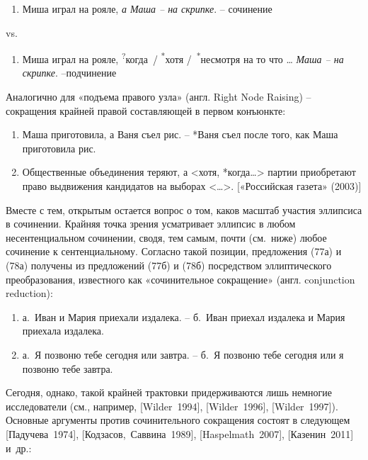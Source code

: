 \begin{enumerate}
\def\labelenumi{(\arabic{enumi})}
\setcounter{enumi}{72}
\item
  Миша играл на рояле, \emph{а Маша -- на скрипке}. -- сочинение
\end{enumerate}

vs.

\begin{enumerate}
\def\labelenumi{(\arabic{enumi})}
\setcounter{enumi}{73}
\item
  Миша играл на рояле, \textsuperscript{?}когда~/
  \textsuperscript{*}хотя /~\textsuperscript{*}несмотря на то что
  \ldots{} \emph{Маша -- на скрипке}. --подчинение
\end{enumerate}

Аналогично для «подъема правого узла» (англ. Right Node Raising) --
сокращения крайней правой составляющей в первом конъюнкте:

\begin{enumerate}
\def\labelenumi{(\arabic{enumi})}
\setcounter{enumi}{74}
\item
  Маша приготовила, а Ваня съел рис. -- *Ваня съел после того, как Маша
  приготовила рис.
\item
  Общественные объединения теряют, а \textless*хотя,
  *когда\ldots\textgreater{} партии приобретают право выдвижения
  кандидатов на выборах \textless\ldots\textgreater. {[}«Российская
  газета» (2003){]}
\end{enumerate}

Вместе с тем, открытым остается вопрос о том, каков масштаб участия
эллипсиса в сочинении. Крайняя точка зрения усматривает эллипсис в любом
несентенциальном сочинении, сводя, тем самым, почти (см.~ниже) любое
сочинение к сентенциальному. Согласно такой позиции, предложения (77а) и
(78а) получены из предложений (77б) и (78б) посредством эллиптического
преобразования, известного как «сочинительное сокращение» (англ.
conjunction reduction):

\begin{enumerate}
\def\labelenumi{(\arabic{enumi})}
\setcounter{enumi}{76}
\item
  а.~Иван и Мария приехали издалека. -- б.~Иван приехал издалека и Мария
  приехала издалека.
\item
  а.~Я позвоню тебе сегодня или завтра. -- б.~Я позвоню тебе сегодня или
  я позвоню тебе завтра.
\end{enumerate}

Сегодня, однако, такой крайней трактовки придерживаются лишь немногие
исследователи (см., например, {[}Wilder~1994{]}, {[}Wilder~1996{]},
{[}Wilder~1997{]}). Основные аргументы против сочинительного сокращения
состоят в следующем {[}Падучева~1974{]}, {[}Кодзасов,~Саввина~1989{]},
{[}Haspelmath~2007{]}, {[}Казенин~2011{]} и~др.:

